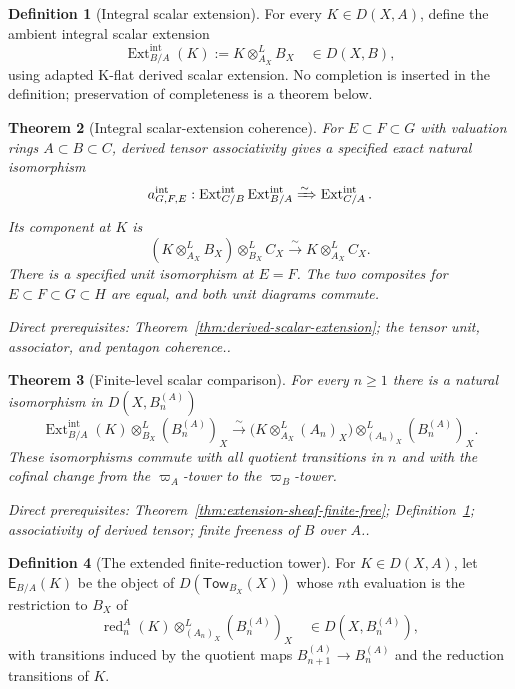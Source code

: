 \documentclass[10pt]{article}
\newtheorem{theorem}{Theorem}[section]
\theoremstyle{definition}
\newtheorem{definition}[theorem]{Definition}
\newcommand{\depends}[1]{\par\smallskip\noindent\textit{Direct prerequisites:} #1.}
\begin{document}
\begin{definition}[Integral scalar extension]\label{def:integral-extension}
For every $K\in D(X,A)$, define the ambient integral scalar extension
\[
 \operatorname{Ext}^{\mathrm{int}}_{B/A}(K)
 :=K\otimes^L_{A_X}B_X
 \quad\in D(X,B),
\]
using adapted K-flat derived scalar extension.  No completion is inserted
in the definition; preservation of completeness is a theorem below.
\end{definition}

\begin{theorem}[Integral scalar-extension coherence]
\label{thm:integral-extension-coherence}
For $E\subset F\subset G$ with valuation rings $A\subset B\subset C$,
derived tensor associativity gives a specified exact natural isomorphism
\[
 a^{\mathrm{int}}_{G,F,E}:
 \operatorname{Ext}^{\mathrm{int}}_{C/B}
 \operatorname{Ext}^{\mathrm{int}}_{B/A}
 \xRightarrow{\sim}
 \operatorname{Ext}^{\mathrm{int}}_{C/A}.
\]
Its component at $K$ is
\[
 (K\otimes^L_{A_X}B_X)\otimes^L_{B_X}C_X
 \xrightarrow{\sim}K\otimes^L_{A_X}C_X.
\]
There is a specified unit isomorphism at $E=F$.  The two composites for
$E\subset F\subset G\subset H$ are equal, and both unit diagrams commute.
\depends{Theorem~\ref{thm:derived-scalar-extension}; the tensor unit,
associator, and pentagon coherence.}
\end{theorem}

\begin{theorem}[Finite-level scalar comparison]
\label{thm:finite-scalar-comparison}
For every $n\geq1$ there is a natural isomorphism in
$D(X,B_n^{(A)})$
\[
 \operatorname{Ext}^{\mathrm{int}}_{B/A}(K)
     \otimes^L_{B_X}(B_n^{(A)})_X
 \xrightarrow{\sim}
 \bigl(K\otimes^L_{A_X}(A_n)_X\bigr)
     \otimes^L_{(A_n)_X}(B_n^{(A)})_X.
\]
These isomorphisms commute with all quotient transitions in $n$ and with
the cofinal change from the $\varpi_A$-tower to the $\varpi_B$-tower.
\depends{Theorem~\ref{thm:extension-sheaf-finite-free};
Definition~\ref{def:integral-extension}; associativity of derived tensor;
finite freeness of $B$ over $A$.}
\end{theorem}

\begin{definition}[The extended finite-reduction tower]
\label{def:extended-reduction-tower}
For $K\in D(X,A)$, let $\mathsf E_{B/A}(K)$ be the object of
$D(\mathsf{Tow}_{B_X}(X))$ whose $n$th evaluation is the restriction to
$B_X$ of
\[
 \operatorname{red}^A_n(K)
 \otimes^L_{(A_n)_X}(B_n^{(A)})_X
 \quad\in D(X,B_n^{(A)}),
\]
with transitions induced by the quotient maps
$B_{n+1}^{(A)}\to B_n^{(A)}$ and the reduction transitions of $K$.
\end{definition}
\end{document}
